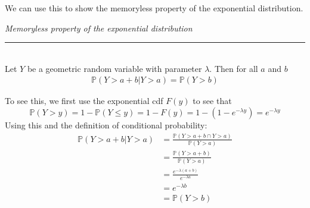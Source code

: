 \documentclass[12pt]{article}
\theoremstyle{definition}
\theoremstyle{remark}
\def\P{{\mathbb P}}
\begin{document}
We can use this to show the memoryless property of the exponential distribution.

\begin{framed}
\emph{Memoryless property of the exponential distribution}\\
  \rule{\dimexpr{}\fboxrule}{.1pt} \\
Let $Y$ be a geometric random variable with parameter $\lambda$. Then for all $a$ and $b$
\begin{align*}
\P(Y > a + b | Y > a) = \P(Y > b)
\end{align*}
\end{framed}
To see this, we first use the exponential cdf $F(y)$ to see that
\[
\P(Y > y) = 1 - \P(Y \leq y) = 1 - F(y) = 1 - (1 - e^{-\lambda y}) = e^{-\lambda y}
\]
Using this and the definition of conditional probability:
\begin{align*}
\P(Y > a + b | Y > a) &= \frac{ \P(Y > a + b \cap Y > a) }{ \P(Y > a )} \\
&= \frac{ \P(Y > a + b ) }{ \P(Y > a )} \\
&= \frac{e^{-\lambda(a+b)}}{e^{-\lambda a}} \\
&= e^{-\lambda b} \\
&= \P(Y > b)
\end{align*}
\end{document}
